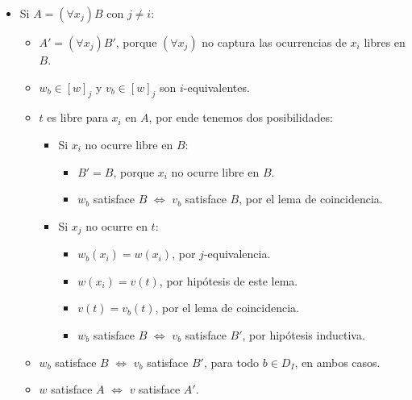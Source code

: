 \begin{prove}
\begin{itemize}
    \item Si $A = (\forall x_j) B$ con $j \ne i$:
    \begin{itemize}
        \item $A' = (\forall x_j) B'$, porque $(\forall x_j)$ no captura las ocurrencias de $x_i$ libres en $B$.
        \item $w_b \in [w]_j$ y $v_b \in [w]_j$ son $i$-equivalentes.
        \item $t$ es libre para $x_i$ en $A$, por ende tenemos dos posibilidades:
        \begin{itemize}
            \item Si $x_i$ no ocurre libre en $B$:
            \begin{itemize}
                \item $B' = B$, porque $x_i$ no ocurre libre en $B$.
                \item $w_b$ satisface $B$ $\iff$ $v_b$ satisface $B$, por el lema de coincidencia.
            \end{itemize}
            
            \item Si $x_j$ no ocurre en $t$:
            \begin{itemize}
                \item $w_b(x_i) = w(x_i)$, por $j$-equivalencia.
                \item $w(x_i) = v(t)$, por hipótesis de este lema.
                \item $v(t) = v_b(t)$, por el lema de coincidencia.
                \item $w_b$ satisface $B$ $\iff$ $v_b$ satisface $B'$, por hipótesis inductiva.
            \end{itemize}
        \end{itemize}
        \item $w_b$ satisface $B$ $\iff$ $v_b$ satisface $B'$, para todo $b \in D_I$, en ambos casos.
        \item $w$ satisface $A$ $\iff$ $v$ satisface $A'$.
    \end{itemize}
\end{itemize}
\end{prove}

